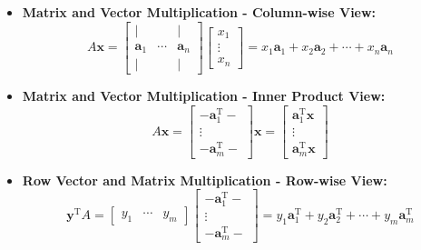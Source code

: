 \documentclass{article}
\begin{document}
\begin{itemize}
    \item \textbf{Matrix and Vector Multiplication - Column-wise View:}
    \begin{equation}
        A\mathbf{x} =
        \left[
            \begin{array}{ccc}
                | &        & | \\
                \mathbf{a}_1 & \cdots & \mathbf{a}_n \\
                | &        & |
            \end{array}
        \right]
        \left[
            \begin{array}{c}
                x_1 \\
                \vdots \\
                x_n
            \end{array}
        \right]
        =
        x_1\mathbf{a}_1 + x_2\mathbf{a}_2 + \cdots + x_n\mathbf{a}_n
        \label{eq:matvec_col}
    \end{equation}

    \item \textbf{Matrix and Vector Multiplication - Inner Product View:}
    \begin{equation}
        A\mathbf{x} =
        \left[
            \begin{array}{c}
                - \mathbf{a}_1^{\mathrm{T}} - \\
                \vdots \\
                - \mathbf{a}_m^{\mathrm{T}} -
            \end{array}
        \right]
        \mathbf{x}
        =
        \left[
            \begin{array}{c}
                \mathbf{a}_1^{\mathrm{T}} \mathbf{x} \\
                \vdots \\
                \mathbf{a}_m^{\mathrm{T}} \mathbf{x}
            \end{array}
        \right]
        \label{eq:matvec_row}
    \end{equation}

    \item \textbf{Row Vector and Matrix Multiplication - Row-wise View:}
    \begin{equation}
        \mathbf{y}^{\mathrm{T}} A =
        \left[
            \begin{array}{ccc}
                y_1 & \cdots & y_m
            \end{array}
        \right]
        \left[
            \begin{array}{c}
                - \mathbf{a}_1^{\mathrm{T}} - \\
                \vdots \\
                - \mathbf{a}_m^{\mathrm{T}} -
            \end{array}
        \right]
        =
        y_1\mathbf{a}_1^{\mathrm{T}} + y_2\mathbf{a}_2^{\mathrm{T}} + \cdots + y_m\mathbf{a}_m^{\mathrm{T}}
        \label{eq:rowvecmat_row}
    \end{equation}


\end{itemize}
\end{document}
